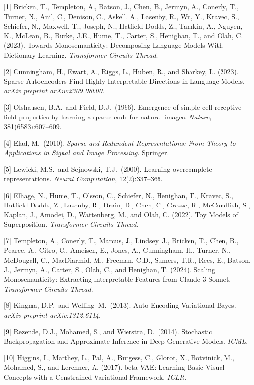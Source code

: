 \documentclass{article}
\begin{document}
{\small

[1] Bricken, T., Templeton, A., Batson, J., Chen, B., Jermyn, A., Conerly, T., Turner, N., Anil, C., Denison, C., Askell, A., Lasenby, R., Wu, Y., Kravec, S., Schiefer, N., Maxwell, T., Joseph, N., Hatfield-Dodds, Z., Tamkin, A., Nguyen, K., McLean, B., Burke, J.E., Hume, T., Carter, S., Henighan, T., and Olah, C. (2023). Towards Monosemanticity: Decomposing Language Models With Dictionary Learning. \textit{Transformer Circuits Thread}.

[2] Cunningham, H., Ewart, A., Riggs, L., Huben, R., and Sharkey, L. (2023). Sparse Autoencoders Find Highly Interpretable Directions in Language Models. \textit{arXiv preprint arXiv:2309.08600}.

[3] Olshausen, B.A.\ and Field, D.J.\ (1996). Emergence of simple-cell receptive field properties by learning a sparse code for natural images. \textit{Nature}, 381(6583):607--609.

[4] Elad, M.\ (2010). \textit{Sparse and Redundant Representations: From Theory to Applications in Signal and Image Processing}. Springer.

[5] Lewicki, M.S.\ and Sejnowski, T.J.\ (2000). Learning overcomplete representations. \textit{Neural Computation}, 12(2):337--365.

[6] Elhage, N., Hume, T., Olsson, C., Schiefer, N., Henighan, T., Kravec, S., Hatfield-Dodds, Z., Lasenby, R., Drain, D., Chen, C., Grosse, R., McCandlish, S., Kaplan, J., Amodei, D., Wattenberg, M., and Olah, C. (2022). Toy Models of Superposition. \textit{Transformer Circuits Thread}.

[7] Templeton, A., Conerly, T., Marcus, J., Lindsey, J., Bricken, T., Chen, B., Pearce, A., Citro, C., Ameisen, E., Jones, A., Cunningham, H., Turner, N., McDougall, C., MacDiarmid, M., Freeman, C.D., Sumers, T.R., Rees, E., Batson, J., Jermyn, A., Carter, S., Olah, C., and Henighan, T. (2024). Scaling Monosemanticity: Extracting Interpretable Features from Claude 3 Sonnet. \textit{Transformer Circuits Thread}.

[8] Kingma, D.P.\ and Welling, M.\ (2013). Auto-Encoding Variational Bayes. \textit{arXiv preprint arXiv:1312.6114}.

[9] Rezende, D.J., Mohamed, S., and Wierstra, D.\ (2014). Stochastic Backpropagation and Approximate Inference in Deep Generative Models. \textit{ICML}.

[10] Higgins, I., Matthey, L., Pal, A., Burgess, C., Glorot, X., Botvinick, M., Mohamed, S., and Lerchner, A. (2017). beta-VAE: Learning Basic Visual Concepts with a Constrained Variational Framework. \textit{ICLR}.

}
\end{document}
